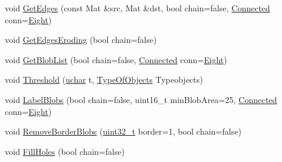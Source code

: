 \begin{DoxyCompactItemize}
\item 
void \hyperlink{class_vision_1_1_segment_a427f6a51ce04127927ae60d8b9ba8e12}{Get\+Edges} (const Mat \&src, Mat \&dst, bool chain=false, \hyperlink{class_vision_1_1_segment_a330240c08320e72270fac0aa83d5e27e}{Connected} conn=\hyperlink{class_vision_1_1_segment_a330240c08320e72270fac0aa83d5e27eae8e2b0fa6d15448f10cddc0390284a39}{Eight})
\item 
void \hyperlink{class_vision_1_1_segment_af4fe7471c44ded04653f8e3f74162c86}{Get\+Edges\+Eroding} (bool chain=false)
\item 
void \hyperlink{class_vision_1_1_segment_a6dba1b8506fe7e8054e99ea5330d4abc}{Get\+Blob\+List} (bool chain=false, \hyperlink{class_vision_1_1_segment_a330240c08320e72270fac0aa83d5e27e}{Connected} conn=\hyperlink{class_vision_1_1_segment_a330240c08320e72270fac0aa83d5e27eae8e2b0fa6d15448f10cddc0390284a39}{Eight})
\item 
void \hyperlink{class_vision_1_1_segment_a1d486dd3b67e1e1208c9ca04be8f6659}{Threshold} (\hyperlink{_soil_math_types_8h_a65f85814a8290f9797005d3b28e7e5fc}{uchar} t, \hyperlink{class_vision_1_1_segment_ac3ddf2c72ee6333007510b680db1e7dd}{Type\+Of\+Objects} Typeobjects)
\item 
void \hyperlink{class_vision_1_1_segment_ac10de08f4c3b0f8cb91f0469b6cf37c9}{Label\+Blobs} (bool chain=false, uint16\+\_\+t min\+Blob\+Area=25, \hyperlink{class_vision_1_1_segment_a330240c08320e72270fac0aa83d5e27e}{Connected} conn=\hyperlink{class_vision_1_1_segment_a330240c08320e72270fac0aa83d5e27eae8e2b0fa6d15448f10cddc0390284a39}{Eight})
\item 
void \hyperlink{class_vision_1_1_segment_a65a50340b5a1a0fb08a1b5749b7145b6}{Remove\+Border\+Blobs} (\hyperlink{_soil_math_types_8h_a435d1572bf3f880d55459d9805097f62}{uint32\+\_\+t} border=1, bool chain=false)
\item 
void \hyperlink{class_vision_1_1_segment_a9b1476507a27dbef21acca64efd217b8}{Fill\+Holes} (bool chain=false)
\end{DoxyCompactItemize}
